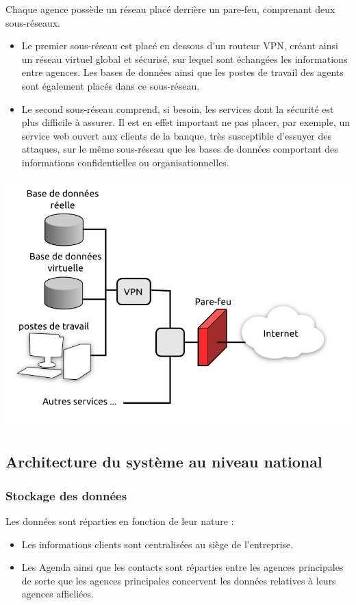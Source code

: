 \documentclass[a4paper]{article}
\begin{document}
Chaque agence possède un réseau placé derrière un pare-feu, comprenant deux sous-réseaux.
\begin{itemize}
  \item Le premier sous-réseau est placé en dessous d'un routeur VPN, créant ainsi un réseau virtuel global et sécurisé, sur lequel sont échangées les informations entre agences. Les bases de données ainsi que les postes de travail des agents sont également placés dans ce sous-réseau.
  \item Le second sous-réseau comprend, si besoin, les services dont la sécurité est plus difficile à assurer. Il est en effet important ne pas placer, par exemple, un service web ouvert aux clients de la banque, très susceptible d'essuyer des attaques, sur le même sous-réseau que les bases de données comportant des informations confidentielles ou organisationnelles. 
\end{itemize}

\includegraphics[width=\linewidth]{Includes/archi_agence.png}


\subsection{Architecture du système au niveau national}
\subsubsection{ Stockage des données }

Les données sont réparties en fonction de leur nature :
\begin{itemize}
  \item Les informations clients sont centralisées au siège de l'entreprise.
  \item Les Agenda ainsi que les contacts sont réparties entre les agences principales de sorte que les agences principales concervent les données relatives à leurs agences afficliées.
\end{itemize}
  
\end{document}
